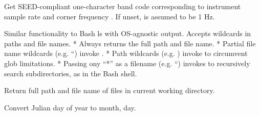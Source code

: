 \documentclass[letterpaper,11pt,english]{sphinxmanual}
\begin{document}
\begin{fulllineitems}
\label{\detokenize{src/Appendices/function_list:getbandcode}}
\end{fulllineitems}


Get SEED-compliant one-character band code corresponding to instrument sample rate  and corner frequency . If unset,  is assumed to be 1 Hz.

\begin{fulllineitems}
\label{\detokenize{src/Appendices/function_list:ls}}
\end{fulllineitems}


Similar functionality to Bash ls with OS-agnostic output. Accepts wildcards in paths and file names.
* Always returns the full path and file name.
* Partial file name wildcards (e.g. “) invoke .
* Path wildcards (e.g. ) invoke  to circumvent glob limitations.
* Passing ony “*” as a filename (e.g. “) invokes  to recursively search subdirectories, as in the Bash shell.

\begin{fulllineitems}
\end{fulllineitems}


Return full path and file name of files in current working directory.

\begin{fulllineitems}
\label{\detokenize{src/Appendices/function_list:j2md}}
\end{fulllineitems}


Convert Julian day  of year  to month, day.

\begin{fulllineitems}
\label{\detokenize{src/Appendices/function_list:md2j}}
\end{fulllineitems}
\end{document}
